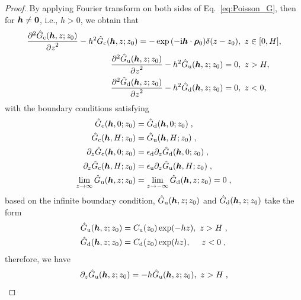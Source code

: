 \begin{proof}
    By applying Fourier transform on both sides of Eq.~\eqref{eq:Poisson_G}, then for $\boldsymbol{h}\neq \bm{0}$, i.e., $h>0$, we obtain that
    \begin{equation*} 
        \begin{split}
            \frac{\partial^2 \Hat{G}_{\mathrm{c}}(\boldsymbol{h}, z; z_0)}{{\partial z}^2} - h^2 \Hat{G}_{\mathrm{c}}(\boldsymbol{h}, z; z_0) = - \exp{(-\mathrm{i} \boldsymbol{h} \cdot \boldsymbol{\rho}_0)}\delta (z- z_0)&,~z \in [0, H],\\
            \frac{\partial^2 \hat{G}_{\mathrm{u}}(\boldsymbol{h}, z; z_0)}{{\partial z}^2} - h^2 \hat{G}_{\mathrm{u}}(\boldsymbol{h}, z; z_0) = 0&,~z > H,\\
            \frac{\partial^2 \hat{G}_{\mathrm{d}}(\boldsymbol{h}, z; z_0)}{{\partial z}^2} - h^2 \hat{G}_{\mathrm{d}}(\boldsymbol{h}, z; z_0) = 0&,~z < 0,
        \end{split}
    \end{equation*}
    with the boundary conditions satisfying    
    \begin{equation*}
        \begin{split}
            \Hat{G}_{\mathrm{c}}(\boldsymbol{h}, 0; z_0) &= \Hat{G}_{\mathrm{d}}(\boldsymbol{h}, 0; z_0)\;,\\
            \hat{G}_{\mathrm{c}}(\boldsymbol{h}, H; z_0) &= \hat{G}_{\mathrm{u}}(\boldsymbol{h}, H; z_0)\;,\\
              \partial_z\Hat{G}_{\mathrm{c}}(\boldsymbol{h}, 0; z_0) &= \epsilon_{\mathrm{d}} \partial_z\Hat{G}_{\mathrm{d}}(\boldsymbol{h}, 0; z_0)\;,\\
              \partial_z\Hat{G}_{\mathrm{c}}(\boldsymbol{h}, H; z_0) &= \epsilon_{\mathrm{u}} \partial_z\Hat{G}_{\mathrm{u}}(\boldsymbol{h}, H; z_0)\;,\\
            \lim_{z \to \infty} \Hat{G}_{\mathrm{u}}(\boldsymbol{h}, z; z_0) &= \lim_{z \to -\infty}\Hat{G}_{\mathrm{d}}(\boldsymbol{h}, z; z_0)  = 0\;,
        \end{split}
    \end{equation*}
based on the infinite boundary condition,  $\Hat{G}_{\mathrm{u}}(\boldsymbol{h}, z; z_0)$ and $\Hat{G}_{\mathrm{d}}(\boldsymbol{h}, z; z_0)$ take the form
\begin{align*}
    \Hat{G}_{\mathrm{u}}(\boldsymbol{h}, z; z_0)&=C_{\mathrm{u}}(z_0)\exp(- h z),~z > H\;,\\
     \Hat{G}_{\mathrm{d}}(\boldsymbol{h}, z; z_0)&=C_{\mathrm{d}}(z_0)\exp(h z),~~~~z < 0\;,
\end{align*}
therefore, we have 
\begin{align*}
    \partial_z\Hat{G}_{\mrm{u}}(\V{h}, z; z_0)&=-h\Hat{G}_{\mrm{u}}(\V{h}, z; z_0),~z > H\;,\\

\end{align*}
\end{proof}
